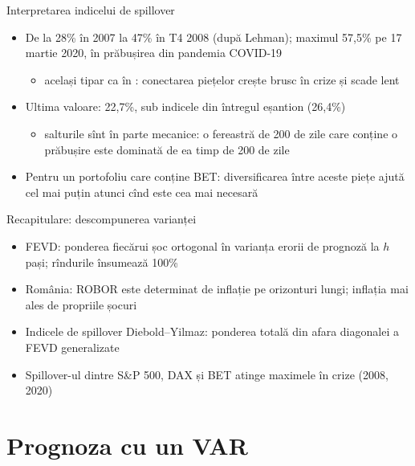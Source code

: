 \begin{frame}{Interpretarea indicelui de spillover}
\itemsize{\small}
\begin{itemize}
    \item De la 28\% în 2007 la 47\% în T4 2008 (după Lehman); maximul 57{,}5\% pe 17 martie 2020, în prăbușirea din pandemia COVID-19
    \begin{itemize}
        \item același tipar ca în : conectarea piețelor crește brusc în crize și scade lent
    \end{itemize}
    \item Ultima valoare: 22{,}7\%, sub indicele din întregul eșantion (26{,}4\%)
    \begin{itemize}
        \item salturile sînt în parte mecanice: o fereastră de 200 de zile care conține o prăbușire este dominată de ea timp de 200 de zile
    \end{itemize}
    \item Pentru un portofoliu care conține BET: diversificarea între aceste piețe ajută cel mai puțin atunci cînd este cea mai necesară
\end{itemize}
\end{frame}

\begin{frame}{Recapitulare: descompunerea varianței}
\itemsize{\small}
\begin{itemize}
    \item FEVD: ponderea fiecărui șoc ortogonal în varianța erorii de prognoză la $h$ pași; rîndurile însumează 100\%
    \item România: ROBOR este determinat de inflație pe orizonturi lungi; inflația mai ales de propriile șocuri
    \item Indicele de spillover Diebold--Yilmaz: ponderea totală din afara diagonalei a FEVD generalizate
    \item Spillover-ul dintre S\&P 500, DAX și BET atinge maximele în crize (2008, 2020)
\end{itemize}
\end{frame}


\section{Prognoza cu un VAR}

